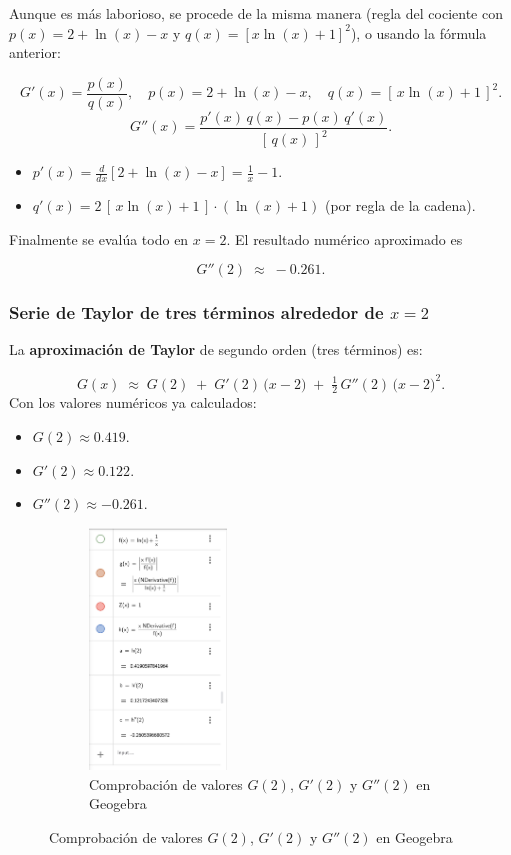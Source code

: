 Aunque es más laborioso, se procede de la misma manera (regla del cociente con \(p(x)=2+\ln(x)-x\) y \(q(x)=[x\ln(x)+1]^2\)), o usando la fórmula anterior:

\[
G'(x)=\frac{p(x)}{q(x)}, 
\quad
p(x)=2+\ln(x)-x,\quad
q(x)=[\,x\ln(x)+1\,]^2.
\]
\[
G''(x)=\frac{p'(x)\,q(x)-p(x)\,q'(x)}{[\,q(x)\,]^2}.
\]

\begin{itemize}
    \item \(p'(x)=\tfrac{d}{dx}[2+\ln(x)-x]=\tfrac{1}{x}-1.\)
    \item \(q'(x)=2\,[\,x\ln(x)+1\,]\cdot(\ln(x)+1)\)  (por regla de la cadena).
\end{itemize}

Finalmente se evalúa todo en \(x=2\). El resultado numérico aproximado es

\[
G''(2)\;\approx\;-0.261.
\]

\subsubsection{Serie de Taylor de tres términos alrededor de \(x=2\)}

La \textbf{aproximación de Taylor} de segundo orden (tres términos) es:

\[
G(x)\;\approx\;G(2)
\;+\;G'(2)\,\bigl(x-2\bigr)
\;+\;\tfrac12\,G''(2)\,\bigl(x-2\bigr)^{2}.
\]
Con los valores numéricos ya calculados:

\begin{itemize}
    \item \(G(2)\approx 0.419.\)
    \item \(G'(2)\approx 0.122.\)
    \item \(G''(2)\approx -0.261.\)
\end{itemize}

\begin{figure}[H]
    \centering
    \begin{subfigure}[b]{\textwidth}
        \centering
        \includegraphics[width=0.4\textwidth]{Figures/0. General/1.2.png}
        \caption{Comprobación de valores $G(2)$, $G'(2)$ y $G''(2)$ en Geogebra}
        \label{fig: Comprobacion en Geogebra}
    \end{subfigure}
\end{figure}

